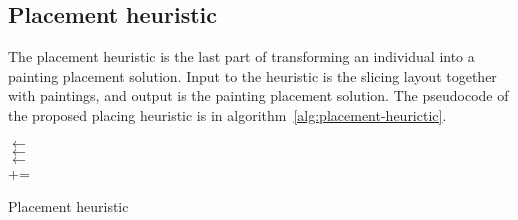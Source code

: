 \newpage

\subsection{Placement heuristic}\label{subsec:placement-heuristic}

The placement heuristic is the last part of transforming an individual into a painting placement solution.
Input to the heuristic is the slicing layout together with paintings, and output is the painting placement solution.
The pseudocode of the proposed placing heuristic is in algorithm~\ref{alg:placement-heurictic}.

\begin{algorithm}[H]
    \SetAlgoLined
    \LinesNumbered





    \KwData{\SlicingLayout, \Paintings}
     \BlankLine


    \PlacedPaintings $\leftarrow$ \EmptyList \\

     {
        \Best $\leftarrow$ \Nil \\
         {
            \PlacedPainting $\leftarrow$ \\
            \If{\Best == \Nil\\
            \Or \Objective{\PlacedPaintings$+$\PlacedPainting, \SlicingLayout}\\
                $<$  \Objective{\PlacedPaintings $+$ \Best, \SlicingLayout}}{
                \Best $\leftarrow$ \PlacedPainting
            }
        }
        \PlacedPaintings += \Best
    }

    \KwRet{\PlacedPaintings}

    \caption{Placement heuristic}\label{alg:placement-heurictic}
\end{algorithm}

